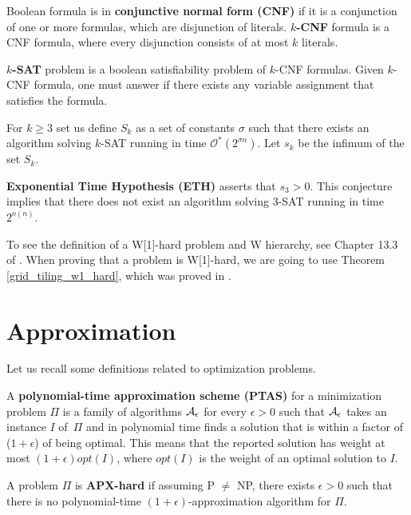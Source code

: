\begin{defi}
\label{definition:cnf}
Boolean formula is in \textbf{conjunctive normal form (CNF)} if
it is a conjunction of one or more formulas,
which are disjunction of literals.
\textbf{$k$-CNF} formula is a CNF formula, where
every disjunction consists of at most $k$ literals.
\end{defi}

\begin{defi}
\textbf{\textsc{$k$-SAT}} problem is 
a boolean satisfiability problem of $k$-CNF formulas.
Given $k$-CNF formula, one must answer if there
exists any variable assignment that satisfies the formula.
\end{defi}

\begin{defi}
For $k \ge 3$ set us define $S_k$ as a set of constants $\sigma$
such that there exists an algorithm solving \textsc{$k$-SAT} running in time
$\mathcal{O}^{*}(2^{\sigma n})$.
Let $s_k$ be the infimum  of the set $S_k$.

\textbf{Exponential Time Hypothesis (ETH)} asserts
that $s_3 > 0$. This conjecture implies that
there does not exist an algorithm solving \textsc{3-SAT}
running in time $2^{o(n)}$.
\end{defi}

To see the definition of a W[1]-hard problem and W hierarchy,
see Chapter 13.3 of \cite{platypus_book}.
When proving that a problem is W[1]-hard,
we are going to use Theorem 
\ref{grid_tiling_w1_hard}, which was proved in \cite{marx_grid_tiling}.

\section{Approximation}

Let us recall some definitions related to optimization problems.

\begin{defi}
A \textbf{polynomial-time approximation scheme (PTAS)}
for a minimization problem $\Pi$
is a family of algorithms $\cal{A}_\epsilon$ for
every $\epsilon > 0$
such that $\cal{A}_\epsilon$ takes an instance $I$ of~$\Pi$
and in polynomial time
finds a solution that is within a factor
of ($1+\epsilon$) of being optimal.
This means that the reported solution has weight at most
$(1+\epsilon)opt(I)$, where $opt(I)$ is the weight
of an optimal solution to $I$.
\end{defi}

\begin{defi}
A problem $\Pi$ is \textbf{APX-hard} if assuming P $\neq$ NP,
there exists $\epsilon > 0$
such that there is no polynomial-time $(1+\epsilon)$-approximation algorithm
for $\Pi$.
\end{defi}


